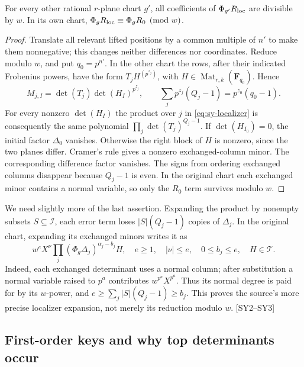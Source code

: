 \begin{lemma}\label{lem:sy-isolation}
For every other rational $r$-plane chart $g'$, all coefficients of $\Phi_{g'}R_{\rm loc}$ are divisible by $w$. In its own chart, $\Phi_gR_{\rm loc}\equiv\Phi_gR_0\pmod w$.
\end{lemma}
\begin{proof}
Translate all relevant lifted positions by a common multiple of $n'$ to make them nonnegative; this changes neither differences nor coordinates. Reduce modulo $w$, and put $q_0=p^{n'}$. In the other chart the rows, after their indicated Frobenius powers, have the form $T_jH^{(p^{z_j})}$, with $H\in\operatorname{Mat}_{r,k}(\mathbf F_{q_0})$. Hence
\[
M_{j,I}=\det(T_j)\det(H_I)^{p^{z_j}},\qquad
\sum_j p^{z_j}(Q_j-1)=p^{z_0}(q_0-1).
\]
For every nonzero $\det(H_I)$ the product over $j$ in \eqref{eq:sy-localizer} is consequently the same polynomial $\prod_j\det(T_j)^{Q_j-1}$. If $\det(H_{I_0})=0$, the initial factor $\Delta_0$ vanishes. Otherwise the right block of $H$ is nonzero, since the two planes differ. Cramer's rule gives a nonzero exchanged-column minor. The corresponding difference factor vanishes. The signs from ordering exchanged columns disappear because $Q_j-1$ is even. In the original chart each exchanged minor contains a normal variable, so only the $R_0$ term survives modulo $w$.
\end{proof}

We need slightly more of the last assertion. Expanding the product by nonempty subsets $S\subseteq\mathcal I$, each error term loses $|S|(Q_j-1)$ copies of $\Delta_j$. In the original chart, expanding its exchanged minors writes it as
\begin{equation}\label{eq:sy-local-error}
w^e X^{\nu}\prod_j(\Phi_g\Delta_j)^{\alpha_j-b_j}H,
\quad e\ge1,\quad |\nu|\le e,\quad 0\le b_j\le e,\quad H\in\mathcal T.
\end{equation}
Indeed, each exchanged determinant uses a normal column; after substitution a normal variable raised to $p^a$ contributes $w^{p^a}X^{p^a}$. Thus its normal degree is paid for by its $w$-power, and $e\ge\sum_j|S|(Q_j-1)\ge b_j$. This proves the source's more precise localizer expansion, not merely its reduction modulo $w$. \textsf{[SY2--SY3]}

\subsection{First-order keys and why top determinants occur}

